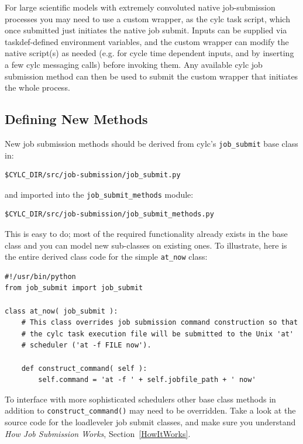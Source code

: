 \documentclass[11pt,a4paper]{article}
\begin{document}
For large scientific models with extremely convoluted native
job-submission processes you may need to use a custom wrapper, 
as the cylc task script, which once submitted just initiates the 
native job submit. Inputs can be supplied via taskdef-defined
environment variables, and the custom wrapper can modify the native
script(s) as needed (e.g. for cycle time dependent inputs, and by
inserting a few cylc messaging calls) before invoking them.
Any available cylc job submission method can then be used to submit the
custom wrapper that initiates the whole process.

\subsection{Defining New Methods}

New job submission methods should be derived from cylc's
\lstinline=job_submit= base class in:

\begin{lstlisting}
$CYLC_DIR/src/job-submission/job_submit.py
\end{lstlisting}

and imported into the \lstinline=job_submit_methods= module:

\begin{lstlisting}
$CYLC_DIR/src/job-submission/job_submit_methods.py
\end{lstlisting}

This is easy to do; most of the required functionality already exists in
the base class and you can model new sub-classes on existing ones. To
illustrate, here is the entire derived class code for the simple 
\lstinline=at_now= class:

\lstset{language=Python}

\begin{lstlisting}
#!/usr/bin/python
from job_submit import job_submit

class at_now( job_submit ):
    # This class overrides job submission command construction so that
    # the cylc task execution file will be submitted to the Unix 'at'
    # scheduler ('at -f FILE now').

    def construct_command( self ):
        self.command = 'at -f ' + self.jobfile_path + ' now'
\end{lstlisting}

To interface with more sophisticated schedulers other base class methods
in addition to \lstinline=construct_command()= may need to be overridden.
Take a look at the source code for the loadleveler job submit classes,
and make sure you understand {\em How Job Submission Works},
Section~\ref{HowItWorks}.
\end{document}
